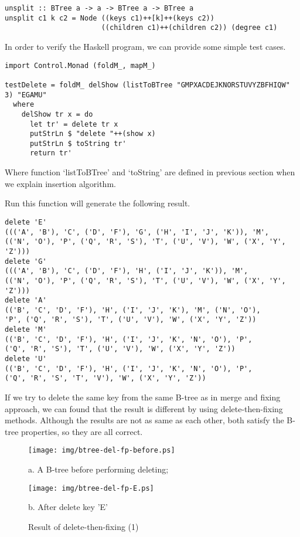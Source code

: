 \documentclass{article}
\begin{document}
\begin{lstlisting}
unsplit :: BTree a -> a -> BTree a -> BTree a
unsplit c1 k c2 = Node ((keys c1)++[k]++(keys c2))
                       ((children c1)++(children c2)) (degree c1)
\end{lstlisting}

In order to verify the Haskell program, we can provide some simple
test cases.

\begin{lstlisting}
import Control.Monad (foldM_, mapM_)

testDelete = foldM_ delShow (listToBTree "GMPXACDEJKNORSTUVYZBFHIQW" 3) "EGAMU"
  where
    delShow tr x = do
      let tr' = delete tr x
      putStrLn $ "delete "++(show x)
      putStrLn $ toString tr'
      return tr'
\end{lstlisting}

Where function `listToBTree' and `toString' are defined in previous section when we
explain insertion algorithm.

Run this function will generate the following result.

\begin{verbatim}
delete 'E'
((('A', 'B'), 'C', ('D', 'F'), 'G', ('H', 'I', 'J', 'K')), 'M',
(('N', 'O'), 'P', ('Q', 'R', 'S'), 'T', ('U', 'V'), 'W', ('X', 'Y', 'Z')))
delete 'G'
((('A', 'B'), 'C', ('D', 'F'), 'H', ('I', 'J', 'K')), 'M',
(('N', 'O'), 'P', ('Q', 'R', 'S'), 'T', ('U', 'V'), 'W', ('X', 'Y', 'Z')))
delete 'A'
(('B', 'C', 'D', 'F'), 'H', ('I', 'J', 'K'), 'M', ('N', 'O'),
'P', ('Q', 'R', 'S'), 'T', ('U', 'V'), 'W', ('X', 'Y', 'Z'))
delete 'M'
(('B', 'C', 'D', 'F'), 'H', ('I', 'J', 'K', 'N', 'O'), 'P',
('Q', 'R', 'S'), 'T', ('U', 'V'), 'W', ('X', 'Y', 'Z'))
delete 'U'
(('B', 'C', 'D', 'F'), 'H', ('I', 'J', 'K', 'N', 'O'), 'P',
('Q', 'R', 'S', 'T', 'V'), 'W', ('X', 'Y', 'Z'))
\end{verbatim}

If we try to delete the same key from the same B-tree as in merge and fixing
approach, we can found that the result is different by using delete-then-fixing
methods. Although the results are not as same as each other, both satisfy
the B-tree properties, so they are all correct.

\begin{figure}[htbp]
    \begin{center}
      \texttt{[image: img/btree-del-fp-before.ps]}

      a. A B-tree before performing deleting;

      \texttt{[image: img/btree-del-fp-E.ps]}

      b. After delete key 'E'
      \caption{Result of delete-then-fixing (1)} \label{fig:result-del-fp1}
    \end{center}
\end{figure}
\end{document}
